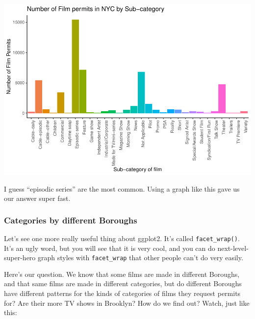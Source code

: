 \documentclass[
]{book}
\begin{document}
\includegraphics{Statistics_Lab_files/figure-latex/1subcategory-1.pdf}

I guess ``episodic series'' are the most common. Using a graph like this gave us our answer super fast.

\hypertarget{categories-by-different-boroughs}{%
\subsubsection{Categories by different Boroughs}\label{categories-by-different-boroughs}}

Let's see one more really useful thing about ggplot2. It's called \texttt{facet\_wrap()}. It's an ugly word, but you will see that it is very cool, and you can do next-level-super-hero graph styles with \texttt{facet\_wrap} that other people can't do very easily.

Here's our question. We know that some films are made in different Boroughs, and that same films are made in different categories, but do different Boroughs have different patterns for the kinds of categories of films they request permits for? Are their more TV shows in Brooklyn? How do we find out? Watch, just like this:
\end{document}
